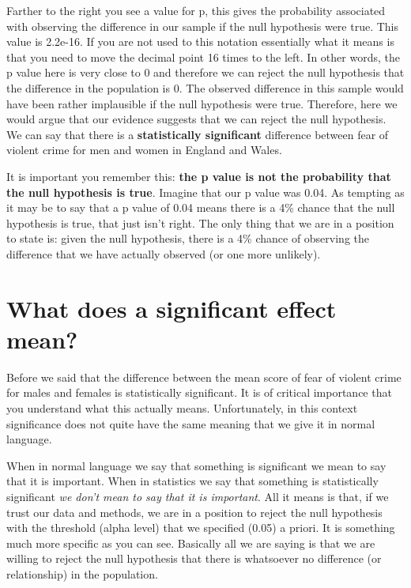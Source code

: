 \documentclass[
]{book}
\begin{document}
Farther to the right you see a value for p, this gives the probability associated with observing the difference in our sample if the null hypothesis were true. This value is 2.2e-16. If you are not used to this notation essentially what it means is that you need to move the decimal point 16 times to the left. In other words, the p value here is very close to 0 and therefore we can reject the null hypothesis that the difference in the population is 0. The observed difference in this sample would have been rather implausible if the null hypothesis were true. Therefore, here we would argue that our evidence suggests that we can reject the null hypothesis. We can say that there is a \textbf{statistically significant} difference between fear of violent crime for men and women in England and Wales.

It is important you remember this: \textbf{the p value is not the probability that the null hypothesis is true}. Imagine that our p value was 0.04. As tempting as it may be to say that a p value of 0.04 means there is a 4\% chance that the null hypothesis is true, that just isn't right. The only thing that we are in a position to state is: given the null hypothesis, there is a 4\% chance of observing the difference that we have actually observed (or one more unlikely).

\hypertarget{what-does-a-significant-effect-mean}{%
\section{What does a significant effect mean?}\label{what-does-a-significant-effect-mean}}

Before we said that the difference between the mean score of fear of violent crime for males and females is statistically significant. It is of critical importance that you understand what this actually means. Unfortunately, in this context significance does not quite have the same meaning that we give it in normal language.

When in normal language we say that something is significant we mean to say that it is important. When in statistics we say that something is statistically significant \emph{we don't mean to say that it is important}. All it means is that, if we trust our data and methods, we are in a position to reject the null hypothesis with the threshold (alpha level) that we specified (0.05) a priori. It is something much more specific as you can see. Basically all we are saying is that we are willing to reject the null hypothesis that there is whatsoever no difference (or relationship) in the population.
\end{document}
